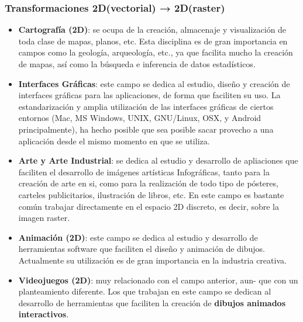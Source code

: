 \subsubsection{Transformaciones 2D(vectorial) → 2D(raster)}
\begin{itemize}
    \item \textbf{Cartografía (2D)}: se ocupa de la creación, almacenaje y visualización de toda clase de mapas, planos, etc. Esta disciplina es de gran importancia en campos como la geología, arqueología, etc., ya que facilita mucho la creación de mapas, así como la búsqueda e inferencia de datos estadísticos.
    \item \textbf{Interfaces Gráficas}: este campo se dedica al estudio, diseño y creación de interfaces gráficas para las aplicaciones, de forma que faciliten su uso. La estandarización y amplia utilización de las interfaces gráficas de ciertos entornos (Mac, MS Windows, UNIX, GNU/Linux, OSX, y Android principalmente), ha hecho posible que sea posible sacar provecho a una aplicación desde el mismo momento en que se utiliza.
    \item \textbf{Arte y Arte Industrial}: se dedica al estudio y desarrollo de apliaciones que faciliten el desarrollo de imágenes artísticas Infográficas, tanto para la creación de arte en si, como para la realización de todo tipo de pósteres, carteles publicitarios, ilustración de libros, etc. En este campo es bastante común trabajar directamente en el espacio 2D discreto, es decir, sobre la imagen raster.
    
    \item \textbf{Animación (2D)}: este campo se dedica al estudio y desarrollo de herramientas software que faciliten el diseño y animación de dibujos. Actualmente su utilización es de gran importancia en la industria creativa.
    
    \item \textbf{Videojuegos (2D)}: muy relacionado con el campo anterior, aun- que con un planteamiento diferente. Los que trabajan en este campo se dedican al desarrollo de herramientas que faciliten la creación de \textbf{dibujos animados interactivos}.
    
\end{itemize}

